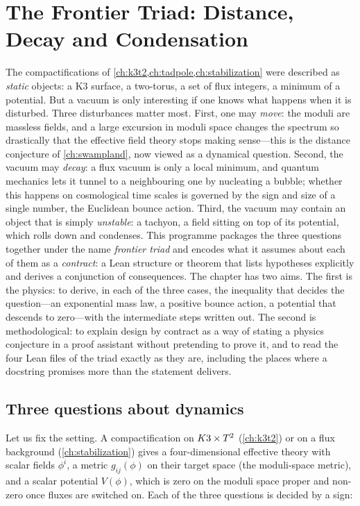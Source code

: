 \chapter{The Frontier Triad: Distance, Decay and Condensation}\label{ch:triad}

The compactifications of \cref{ch:k3t2,ch:tadpole,ch:stabilization} were described as
\emph{static} objects: a K3 surface, a two-torus, a set of flux integers, a minimum of a
potential. But a vacuum is only interesting if one knows what happens when it is disturbed.
Three disturbances matter most. First, one may \emph{move}: the moduli are massless fields, and
a large excursion in moduli space changes the spectrum so drastically that the effective field
theory stops making sense---this is the distance conjecture of \cref{ch:swampland}, now viewed
as a dynamical question. Second, the vacuum may \emph{decay}: a flux vacuum is only a local
minimum, and quantum mechanics lets it tunnel to a neighbouring one by nucleating a bubble;
whether this happens on cosmological time scales is governed by the sign and size of a single
number, the Euclidean bounce action. Third, the vacuum may contain an object that is simply
\emph{unstable}: a tachyon, a field sitting on top of its potential, which rolls down and
condenses. This programme packages the three questions together under the name \emph{frontier
triad} and encodes what it assumes about each of them as a \emph{contract}:
a Lean structure or theorem that lists hypotheses explicitly and derives a conjunction of
consequences. The chapter has two aims. The first is the physics: to derive, in each of the three
cases, the inequality that decides the question---an exponential mass law, a positive bounce
action, a potential that descends to zero---with the intermediate steps written out. The second
is methodological: to explain design by contract as a way of stating a physics conjecture
in a proof assistant without pretending to prove it, and to read the four Lean files of the
triad exactly as they are, including the places where a docstring promises more than the
statement delivers.

\section{Three questions about dynamics}\label{sec:triad:three}

Let us fix the setting. A compactification on $K3\times T^2$ (\cref{ch:k3t2}) or on a flux background
(\cref{ch:stabilization}) gives a four-dimensional effective theory with scalar fields
$\phi^i$, a metric $g_{ij}(\phi)$ on their target space (the moduli-space metric), and a scalar
potential $V(\phi)$, which is zero on the moduli space proper and non-zero once fluxes are
switched on. Each of the three questions is decided by a sign:

